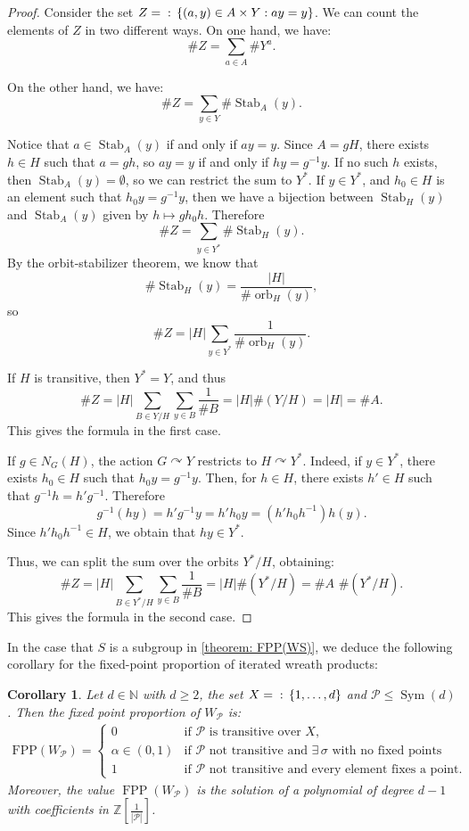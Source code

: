 \documentclass{amsart}
\def\set#1{{\def\st{\;:\;}\left\{#1\right\}}}
\def\abs#1{\left\vert{#1}\right\vert}
\def\ZZ{\mathbb Z}
\def\NN{\mathbb N}
\DeclareMathOperator{\FPP}{FPP}
\DeclareMathOperator{\Stab}{Stab}
\DeclareMathOperator{\orb}{orb}
\DeclareMathOperator{\Sym}{Sym}
\DeclareMathOperator{\st}{st}
\newtheorem{corollary}[Proposition]{Corollary}
\begin{document}
\begin{proof}
Consider the set $Z = \set{(a,y) \in A \times Y: ay = y}$. We can count the elements of $Z$ in two different ways. On one hand, we have: $$\#Z = \sum_{a \in A} \# Y^a.$$

On the other hand, we have: $$\# Z = \sum_{y \in Y} \# \Stab_A(y).$$

Notice that $a \in \Stab_A(y)$ if and only if $ay = y$. Since $A = gH$, there exists $h \in H$ such that $a = gh$, so $ay = y$ if and only if $hy = g^{-1}y$. If no such $h$ exists, then $\Stab_A(y) = \emptyset$, so we can restrict the sum to $Y^*$. If $y \in Y^*$, and $h_0 \in H$ is an element such that $h_0 y= g^{-1}y$, then we have a bijection between $\Stab_H(y)$ and $\Stab_A(y)$ given by $h \mapsto gh_0h$. Therefore $$\#Z = \sum_{y \in Y^*} \# \Stab_H(y).$$ By the orbit-stabilizer theorem, we know that $$\# \Stab_H(y) = \frac{\abs{H}}{\# \orb_H(y)},$$ so $$\#Z = \abs{H} \sum_{y \in Y^*} \frac{1}{\# \orb_H(y)}.$$

If $H$ is transitive, then $Y^* = Y$, and thus $$\# Z = \abs{H} \sum_{B \in Y/H} \sum_{y \in B} \frac{1}{\# B} = \abs{H} \# (Y/H) = \abs{H} = \#A.$$ This gives the formula in the first case. 

If $g \in N_G(H)$, the action $G \curvearrowright Y$ restricts to $H \curvearrowright Y^*$. Indeed, if $y \in Y^*$, there exists $h_0 \in H$ such that $h_0y = g^{-1}y$. Then, for $h \in H$, there exists $h' \in H$ such that $g^{-1}h = h' g^{-1}$. Therefore $$g^{-1}(hy) = h' g^{-1}y = h'h_0 y = (h'h_0 h^{-1}) h(y).$$ Since $h'h_0h^{-1} \in H$, we obtain that $hy \in Y^*$. 

Thus, we can split the sum over the orbits $Y^*/H$, obtaining: $$\# Z = \abs{H} \sum_{B \in Y^*/H} \sum_{y \in B} \frac{1}{\# B} = \abs{H} \# (Y^*/H) = \#A \,\, \# (Y^*/H).$$ This gives the formula in the second case.
\end{proof}

In the case that $S$ is a subgroup in \cref{theorem: FPP(WS)}, we deduce the following corollary for the fixed-point proportion of iterated wreath products:

\begin{corollary}
Let $d \in \NN$ with $d \geq 2$, the set $X = \set{1,\dots,d}$ and $\mathcal{P} \leq \Sym(d)$. Then the fixed point proportion of $W_\mathcal{P}$ is: 
\begin{align*}
\text{FPP}(W_\mathcal{P}) = \left \{ \begin{matrix} 
0 & \mbox{if $\mathcal{P}$ is transitive over $X$,} \\ 
\alpha \in (0,1) & \mbox{if $\mathcal{P}$ not transitive and $\exists \, \sigma$ with no fixed points} \\
1 & \mbox{if $\mathcal{P}$ not transitive and every element fixes a point.}
\end{matrix}\right.
\end{align*}
Moreover, the value $\FPP(W_\mathcal{P})$ is the solution of a polynomial of degree $d-1$ with coefficients in $\ZZ\left[\frac{1}{\abs{\mathcal{P}}}\right]$.
\label{corollary: FPP iterated wreath products}
\end{corollary}
\end{document}
